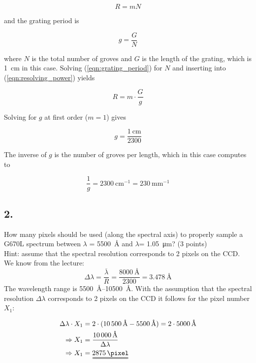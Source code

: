 \documentclass[11pt,a4paper,twoside]{article}
\begin{document}
\begin{equation}
 R = m N
 \label{eqn:resolving_power}
\end{equation}

and the grating period is 

\begin{equation}
 g = \frac{G}{N}
 \label{eqn:grating_period}
\end{equation}

where $N$ is the total number of groves and $G$ is the length of the grating, 
which is \SI{1}{\cm} in this case. Solving (\ref{eqn:grating_period}) 
for $N$ and inserting into (\ref{eqn:resolving_power}) yields 

\begin{equation}
 R = m \cdot \frac{G}{g}
\end{equation}

Solving for $g$ at first order ($m = 1$) gives 

\begin{equation}
 g = \frac{\SI{1}{\cm}}{2300}
\end{equation}

The inverse of $g$ is the number of groves per length, which in this case computes to 

\begin{equation}
 \frac{1}{g} = \SI{2300}{\cm^{-1}} = \SI{230}{\mm^{-1}}
\end{equation}

\subsection*{2.} How many pixels should be used (along the spectral axis) to properly sample a G670L spectrum between $\lambda$ = \SI{5500}{\angstrom} and  $\lambda$= \SI{1.05}{\micro\metre}? (3 points)\\
Hint: assume that the spectral resolution corresponds to 2 pixels on the CCD.\\

We know from the lecture:
\begin{equation}
\Delta\lambda=\frac{\overline{\lambda}}{R}=\frac{\SI{8000}{\angstrom}}{\num{2300}} = \SI{3.478}{\angstrom}
\end{equation}
The wavelength range is \SIrange{5500}{10500}{\angstrom}. With the assumption that the spectral resolution $\Delta\lambda$ corresponds to 2 pixels on the CCD it follows for the pixel number $X_1:$

\begin{eqnarray}
 \Delta\lambda\cdot X_1&=2\cdot(\SI{10500}{\angstrom}-\SI{5500}{\angstrom})=2\cdot \SI{5000}{\angstrom}\\
\Rightarrow X_1&=\frac{\SI{10000}{\angstrom}}{\Delta\lambda}\\
\Rightarrow X_1&=\uuline{\SI{2875}{\pixel}}
\end{eqnarray}
\end{document}
